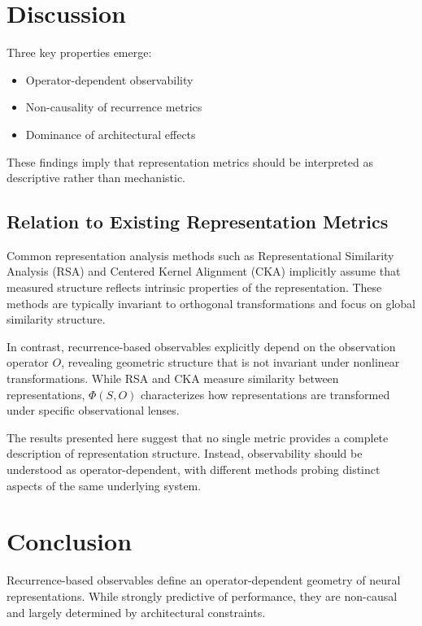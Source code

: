 \documentclass[11pt]{article}
\begin{document}
\section{Discussion}

Three key properties emerge:

\begin{itemize}
	\item Operator-dependent observability
	\item Non-causality of recurrence metrics
	\item Dominance of architectural effects
\end{itemize}

These findings imply that representation metrics should be interpreted as descriptive rather than mechanistic.

\subsection{Relation to Existing Representation Metrics}

Common representation analysis methods such as Representational Similarity Analysis (RSA) and Centered Kernel Alignment (CKA) implicitly assume that measured structure reflects intrinsic properties of the representation.
These methods are typically invariant to orthogonal transformations and focus on global similarity structure.

In contrast, recurrence-based observables explicitly depend on the observation operator $O$, revealing geometric structure that is not invariant under nonlinear transformations.
While RSA and CKA measure similarity between representations, $\Phi(S,O)$ characterizes how representations are transformed under specific observational lenses.

The results presented here suggest that no single metric provides a complete description of representation structure.
Instead, observability should be understood as operator-dependent, with different methods probing distinct aspects of the same underlying system.

\section{Conclusion}

Recurrence-based observables define an operator-dependent geometry of neural representations. While strongly predictive of performance, they are non-causal and largely determined by architectural constraints.
\end{document}
